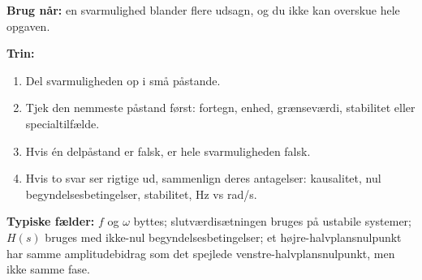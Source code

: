 \textbf{Brug når:} en svarmulighed blander flere udsagn, og du ikke kan overskue hele opgaven.

\textbf{Trin:}
\begin{enumerate}
    \item Del svarmuligheden op i små påstande.
    \item Tjek den nemmeste påstand først: fortegn, enhed, grænseværdi, stabilitet eller specialtilfælde.
    \item Hvis én delpåstand er falsk, er hele svarmuligheden falsk.
    \item Hvis to svar ser rigtige ud, sammenlign deres antagelser: kausalitet, nul begyndelsesbetingelser, stabilitet, Hz vs rad/s.
\end{enumerate}

\textbf{Typiske fælder:} \(f\) og \(\omega\) byttes; slutværdisætningen bruges på ustabile systemer; \(H(s)\) bruges med ikke-nul begyndelsesbetingelser; et højre-halvplansnulpunkt har samme amplitudebidrag som det spejlede venstre-halvplansnulpunkt, men ikke samme fase.
